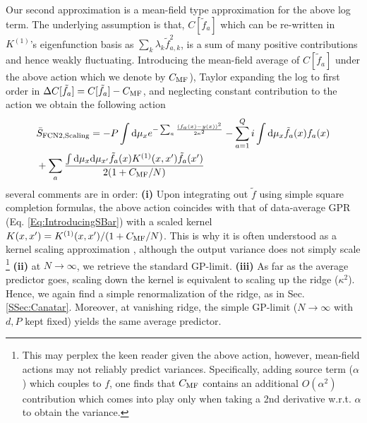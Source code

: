 Our second approximation is a mean-field type approximation for the above log term. The underlying assumption is that, $C[\tilde{f}_a]$ which can be re-written in $K^{(1)}$'s eigenfunction basis as $\sum_k \lambda_k \tilde{f}^2_{a,k}$, is a sum of many positive contributions and hence weakly fluctuating. Introducing the mean-field average of $C[\tilde{f}_a]$ under the above action which we denote by $C_{\text{MF}}$), Taylor expanding the log to first order in $\Delta C[\tilde{f}_a]=C[\tilde{f}_a]-C_{\text{MF}}$, and neglecting constant contribution to the action we obtain the following action 
\begin{align}
\label{Eq:S_FCN2_Rotondo}
&\bar{S}_{\text{FCN2,Scaling}}= -P\int \text{d} \mu_x e^{-\sum_a \frac{(f_a(x)-y(x))^2}{2\kappa^2}} - \sum_{a=1}^Q i\int \text{d}\mu_x \tilde{f}_a(x) f_a(x) \\ \nonumber 
&+\sum_a \frac{ \int \text{d}\mu_{x} \text{d} \mu_{x'}\tilde{f}_a(x)K^{(1)}(x,x')\tilde{f}_a(x')}{2 (1+ C_{\text{MF}}/N)}
\end{align}
several comments are in order: {\bf (i)} Upon integrating out $\tilde{f}$ using simple square completion formulas, the above action coincides with that of data-average GPR (Eq. \ref{Eq:IntroducingSBar}) with a scaled kernel $K(x,x')=K^{(1)}(x,x')/(1+C_{\text{MF}}/N)$. This is why it is often understood as a kernel scaling approximation \citep{ariosto2022statistical}, although the output variance does not simply scale \citep{rubin2024a} \footnote{This may perplex the keen reader given the above action, however, mean-field actions may not reliably predict variances. Specifically, adding source term ($\alpha$) which couples to $f$, one finds that $C_{\text{MF}}$ contains an additional $O(\alpha^2)$ contribution which comes into play only when taking a 2nd derivative w.r.t. $\alpha$ to obtain the variance.} 
{\bf (ii)} at $N \rightarrow \infty$, we retrieve the standard GP-limit. {\bf (iii)} As far as the average predictor goes, scaling down the kernel is equivalent to scaling up the ridge ($\kappa^2$). Hence, we again find a simple renormalization of the ridge, as in Sec. \ref{SSec:Canatar}. Moreover, at vanishing ridge, the simple GP-limit ($N \rightarrow \infty$ with $d,P$ kept fixed) yields the same average predictor.

